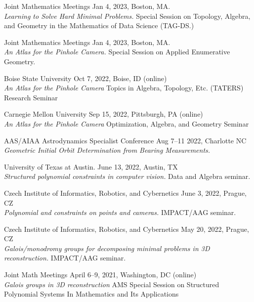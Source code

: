 \documentclass[margin,line,pifont,palatino,courier]{res}
\begin{document}
\begin{resume}
\par Joint Mathematics Meetings \hfill Jan 4, 2023, Boston, MA.\\
\textit{Learning to Solve Hard Minimal Problems.} Special Session on Topology, Algebra, and Geometry in the Mathematics of Data Science (TAG-DS.)

\par Joint Mathematics Meetings \hfill Jan 4, 2023, Boston, MA.\\
\textit{An Atlas for the Pinhole Camera.} Special Session on Applied Enumerative Geometry.

\par Boise State University \hfill Oct 7, 2022, Boise, ID (online)\\
\textit{An Atlas for the Pinhole Camera} Topics in Algebra, Topology, Etc. (TATERS) Research Seminar

\par Carnegie Mellon University \hfill Sep 15, 2022, Pittsburgh, PA (online)\\
\textit{An Atlas for the Pinhole Camera} Optimization, Algebra, and Geometry Seminar

\par AAS/AIAA Astrodynamics Specialist Conference \hfill Aug 7--11 2022, Charlotte NC\\
\textit{Geometric Initial Orbit Determination from Bearing Measurements.} 

\par University of Texas at Austin. \hfill June 13, 2022, Austin, TX\\
\textit{Structured polynomial constraints in computer vision.} Data and Algebra seminar.

\par Czech Institute of Informatics, Robotics, and Cybernetics \hfill June 3, 2022, Prague, CZ\\
\textit{Polynomial and constraints on points and cameras.} IMPACT/AAG seminar. 

\par Czech Institute of Informatics, Robotics, and Cybernetics \hfill May 20, 2022, Prague, CZ\\
\textit{Galois/monodromy groups for decomposing minimal problems in 3D reconstruction.} IMPACT/AAG seminar. 

\par Joint Math Meetings \hfill April 6--9, 2021, Washington, DC (online)\\
\textit{Galois groups in 3D reconstruction} AMS Special Session on Structured Polynomial Systems In Mathematics and Its Applications


\end{resume}
\end{document}
